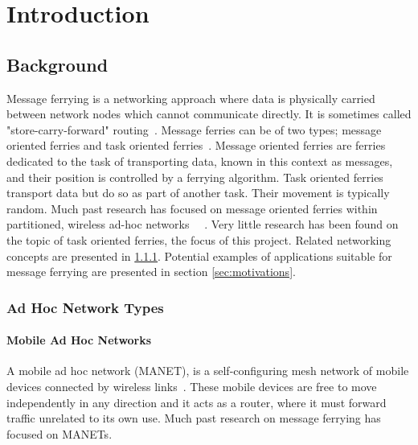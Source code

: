 
\chapter{Introduction} 

\section{Background}
Message ferrying is a networking approach where data is physically carried between network nodes which cannot communicate directly.
It is sometimes called "store-carry-forward" routing~\cite{Routing}.
Message ferries can be of two types; message oriented ferries and task oriented ferries~\cite{hybrid}.
Message oriented ferries are ferries dedicated to the task of transporting data, known in this context as messages, and their position is controlled by a ferrying algorithm.  
Task oriented ferries transport data but do so as part of another task.
Their movement is typically random.
Much past research has focused on message oriented ferries within partitioned, wireless ad-hoc networks~\cite{Routing}~\cite{adhocmsgferry}	.
Very little research has been found on the topic of task oriented ferries, the focus of this project.
Related networking concepts are presented in \ref{sec:net_types}.
Potential examples of applications suitable for message ferrying are presented in section \ref{sec:motivations}.


\subsection{Ad Hoc Network Types}
\label{sec:net_types}

\subsubsection{Mobile Ad Hoc Networks}
A mobile ad hoc network (MANET),  is a self-configuring mesh network of mobile devices connected by wireless links~\cite{book1}.
These mobile devices are free to move independently in any direction and it acts as a router, where it must forward traffic unrelated to its own use.
Much past research on message ferrying has focused on MANETs.


